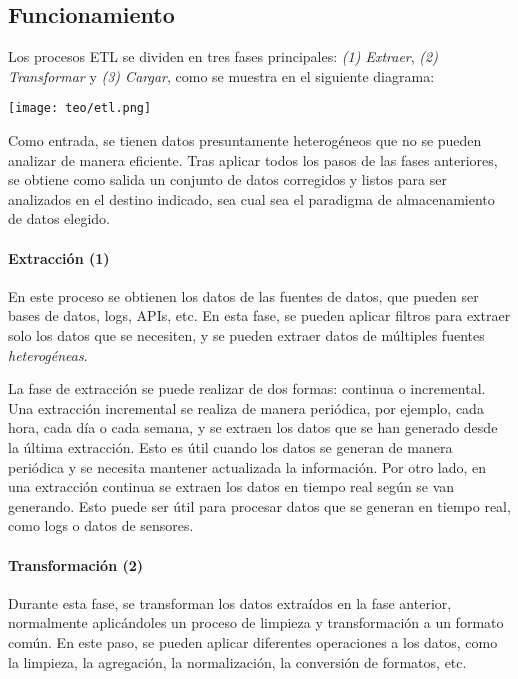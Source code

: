 \subsection{Funcionamiento}
Los procesos ETL se dividen en tres fases principales: \textit{(1) Extraer},
\textit{(2) Transformar} y \textit{(3) Cargar}, como se muestra en el siguiente
diagrama:

\begin{minipage}{\linewidth}
	\centering
	\texttt{[image: teo/etl.png]}
\end{minipage}

Como entrada, se tienen datos presuntamente heterogéneos que no se pueden
analizar de manera eficiente. Tras aplicar todos los pasos de las fases
anteriores, se obtiene como salida un conjunto de datos corregidos y listos para
ser analizados en el destino indicado, sea cual sea el paradigma de
almacenamiento de datos elegido.

\paragraph{Extracción (1)}
En este proceso se obtienen los datos de las fuentes de datos, que pueden ser
bases de datos, logs, APIs, etc. En esta fase, se pueden aplicar filtros para
extraer solo los datos que se necesiten, y se pueden extraer datos de múltiples
fuentes \emph{heterogéneas}.

La fase de extracción se puede realizar de dos formas: continua o incremental.
Una extracción incremental se realiza de manera periódica, por ejemplo, cada
hora, cada día o cada semana, y se extraen los datos que se han generado desde
la última extracción. Esto es útil cuando los datos se generan de manera
periódica y se necesita mantener actualizada la información. Por otro lado, en
una extracción continua se extraen los datos en tiempo real según se van
generando. Esto puede ser útil para procesar datos que se generan en tiempo
real, como logs o datos de sensores.


\newpage{}
\paragraph{Transformación (2)}
Durante esta fase, se transforman los datos extraídos en la fase anterior,
normalmente aplicándoles un proceso de limpieza y transformación a un
formato común. En este paso, se pueden aplicar diferentes operaciones a los
datos, como la limpieza, la agregación, la normalización, la conversión de
formatos, etc.

